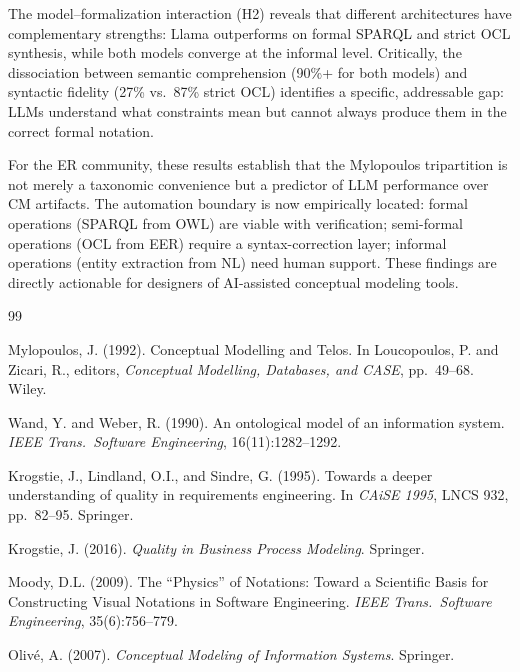 \documentclass[runningheads]{llncs}
\begin{document}
The model--formalization interaction (H2) reveals that different architectures have complementary strengths: Llama outperforms on formal SPARQL and strict OCL synthesis, while both models converge at the informal level. Critically, the dissociation between semantic comprehension (90\%+ for both models) and syntactic fidelity (27\% vs.\ 87\% strict OCL) identifies a specific, addressable gap: LLMs understand what constraints mean but cannot always produce them in the correct formal notation.

For the ER community, these results establish that the Mylopoulos tripartition is not merely a taxonomic convenience but a predictor of LLM performance over CM artifacts. The automation boundary is now empirically located: formal operations (SPARQL from OWL) are viable with verification; semi-formal operations (OCL from EER) require a syntax-correction layer; informal operations (entity extraction from NL) need human support. These findings are directly actionable for designers of AI-assisted conceptual modeling tools.

\begin{thebibliography}{99}

Mylopoulos, J. (1992).
\newblock Conceptual Modelling and {T}elos.
\newblock In Loucopoulos, P. and Zicari, R., editors, \emph{Conceptual Modelling, Databases, and CASE}, pp.\ 49--68. Wiley.

Wand, Y. and Weber, R. (1990).
\newblock An ontological model of an information system.
\newblock \emph{IEEE Trans.\ Software Engineering}, 16(11):1282--1292.

Krogstie, J., Lindland, O.I., and Sindre, G. (1995).
\newblock Towards a deeper understanding of quality in requirements engineering.
\newblock In \emph{CAiSE 1995}, LNCS 932, pp.\ 82--95. Springer.

Krogstie, J. (2016).
\newblock \emph{Quality in Business Process Modeling}. Springer.

Moody, D.L. (2009).
\newblock The ``Physics'' of Notations: Toward a Scientific Basis for Constructing Visual Notations in Software Engineering.
\newblock \emph{IEEE Trans.\ Software Engineering}, 35(6):756--779.

Oliv\'{e}, A. (2007).
\newblock \emph{Conceptual Modeling of Information Systems}. Springer.

\end{thebibliography}
\end{document}
